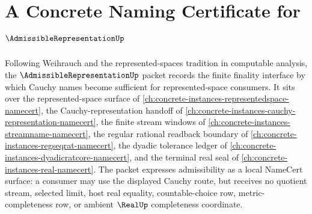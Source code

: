 \chapter{A Concrete Naming Certificate for $\AdmissibleRepresentationUp$}
\label{ch:concrete-instances-admissible-representation-namecert}

Following Weihrauch and the represented-spaces tradition in computable analysis, the $\AdmissibleRepresentationUp$ packet records the finite finality interface by which Cauchy names become sufficient for represented-space consumers. It sits over the represented-space surface of \autoref{ch:concrete-instances-representedspace-namecert}, the Cauchy-representation handoff of \autoref{ch:concrete-instances-cauchy-representation-namecert}, the finite stream windows of \autoref{ch:concrete-instances-streamname-namecert}, the regular rational readback boundary of \autoref{ch:concrete-instances-regseqrat-namecert}, the dyadic tolerance ledger of \autoref{ch:concrete-instances-dyadicratcore-namecert}, and the terminal real seal of \autoref{ch:concrete-instances-real-namecert}. The packet expresses admissibility as a local NameCert surface: a consumer may use the displayed Cauchy route, but receives no quotient stream, selected limit, host real equality, countable-choice row, metric-completeness row, or ambient $\RealUp$ completeness coordinate.

